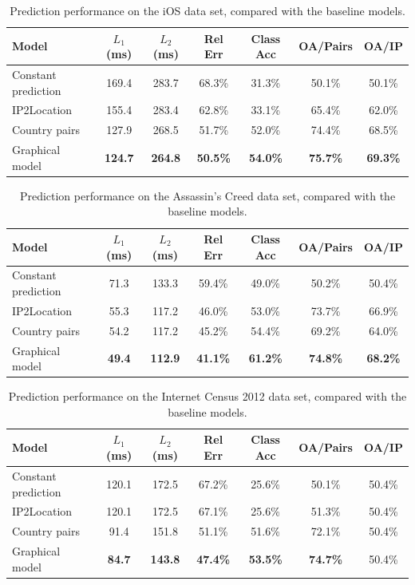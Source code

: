 \documentclass[10pt,a4paper,notitlepage,twocolumn]{article}
\begin{document}
\begin{table}[htp]
\centering
\begin{tabular}{|l|c|c|c|c|c|c|}
\hline Model & $L_1$ (ms)  & $L_2$ (ms) & Rel Err & Class Acc & OA/Pairs & OA/IP \\ \hline\hline
Constant prediction & 169.4 & 283.7 & 68.3\% & 31.3\% & 50.1\% & 50.1\% \\
IP2Location         & 155.4 & 283.4 & 62.8\% & 33.1\% & 65.4\% & 62.0\% \\
Country pairs       & 127.9 & 268.5 & 51.7\% & 52.0\% & 74.4\% & 68.5\% \\
Graphical model & \bf 124.7 & \bf 264.8 & \bf 50.5\% & \bf 54.0\% & \bf 75.7\% & \bf 69.3\% \\ \hline 
\end{tabular} 
\caption{Prediction performance on the iOS data set, compared with the baseline models.}
\label{tab:comp_ios}
\end{table}

\begin{table}[htp]
\centering
\begin{tabular}{|l|c|c|c|c|c|c|}
\hline Model & $L_1$ (ms)  & $L_2$ (ms) & Rel Err & Class Acc & OA/Pairs & OA/IP \\ \hline\hline
Constant prediction & 71.3 & 133.3 & 59.4\% & 49.0\% & 50.2\% & 50.4\% \\
IP2Location         & 55.3 & 117.2 & 46.0\% & 53.0\% & 73.7\% & 66.9\% \\
Country pairs       & 54.2 & 117.2 & 45.2\% & 54.4\% & 69.2\% & 64.0\% \\
Graphical model & \bf 49.4 & \bf 112.9 & \bf 41.1\% & \bf 61.2\% & \bf 74.8\% & \bf 68.2\% \\ \hline 
\end{tabular} 
\caption{Prediction performance on the Assassin's Creed data set, compared with the baseline models.}
\label{tab:comp_ac}
\end{table}

\begin{table}[htp]
\centering
\begin{tabular}{|l|c|c|c|c|c|c|}
\hline Model & $L_1$ (ms)  & $L_2$ (ms) & Rel Err & Class Acc & OA/Pairs & OA/IP \\ \hline\hline
Constant prediction & 120.1 & 172.5 & 67.2\% & 25.6\% & 50.1\% & 50.4\% \\
IP2Location         & 120.1 & 172.5 & 67.1\% & 25.6\% & 51.3\% & 50.4\% \\
Country pairs       &  91.4 & 151.8 & 51.1\% & 51.6\% & 72.1\% & 50.4\% \\
Graphical model & \bf 84.7 & \bf 143.8 & \bf 47.4\% & \bf 53.5\% & \bf 74.7\% & 50.4\% \\ \hline 
\end{tabular} 
\caption{Prediction performance on the Internet Census 2012 data set, compared with the baseline models.}
\label{tab:comp_ic2012}
\end{table}
\end{document}

